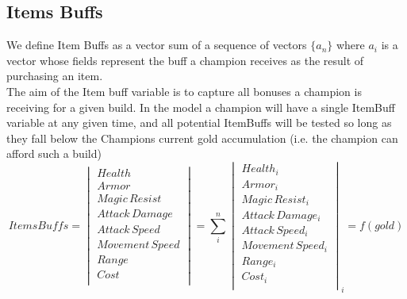 \documentclass{article}
\begin{document}
\subsection{Items Buffs}
We define Item Buffs as a vector  sum of a sequence of vectors $\{a_n\}$  where $a_i$ is a vector whose fields represent the buff a champion receives as the result of purchasing an item.  \\
 The aim of the Item buff variable is to capture all bonuses a champion is receiving for a given build.  
In the model a champion will have a single ItemBuff variable at any given time, and all potential ItemBuffs will be tested so long as they fall below the Champions current gold accumulation (i.e. the champion can afford such a build)
\begin{equation}
Items Buffs = 
\begin{vmatrix}
	 Health\\
	 Armor \\
	 Magic\hspace{2pt} Resist\\
	 Attack \hspace{2pt}Damage\\
	 Attack\hspace{2pt} Speed\\
	 Movement \hspace{2pt} Speed \\
	 Range \\
	Cost\\
\end{vmatrix}=
\sum_i^n
\begin{vmatrix}
	Health_i\\
	Armor_i \\
	Magic \hspace{2pt}Resist_i\\
	Attack \hspace{2pt}Damage_i\\
	Attack \hspace{2pt}Speed_i\\
	Movement \hspace{2pt}Speed_i\\
	Range_i \\
	Cost_i\\
\end{vmatrix}_i= f(gold)
\end{equation}
\end{document}
